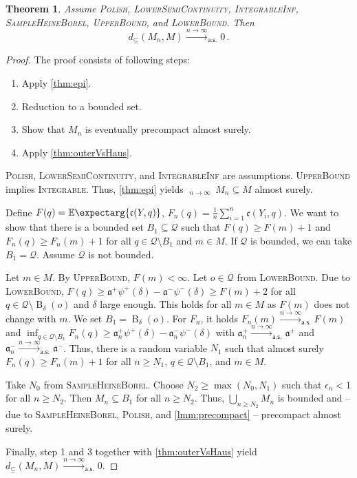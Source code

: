\documentclass{scrartcl}
\renewcommand{\subset}{\subseteq}
\DeclareMathOperator{\ball}{\mathrm{B}}
\newcommand{\Ex}{\E\expectarg}
\newcommand*{\mc}[1]{\mathcal{#1}}
\newcommand*{\ms}[1]{\mathsf{#1}}
\newcommand*{\mf}[1]{\mathfrak{#1}}
\newcommand{\equationFullstop}{\, .}
\newcommand{\eqfs}{\equationFullstop}
\DeclareMathOperator*{\outerlim}{lim\, \overline{sup}}
\theoremstyle{plain}\newtheorem{theorem}{Theorem}[section]
\theoremstyle{definition}
\theoremstyle{remark}
\begin{document}
\begin{theorem}\label{thm:consistency}
	Assume \textsc{Polish}, \textsc{LowerSemiContinuity}, \textsc{IntegrableInf},  \textsc{SampleHeineBorel}, \textsc{UpperBound}, and \textsc{LowerBound}. Then
	\begin{equation*}
		d_\subset(M_n, M) \xrightarrow{n\to\infty}_{\ms{a.s.}} 0
		\eqfs
	\end{equation*}
\end{theorem}
\begin{proof}
The proof consists of following steps:
\begin{enumerate}
\item Apply \autoref{thm:epi}.
\item Reduction to a bounded set.
\item Show that $M_n$ is eventually precompact almost surely.
\item Apply \autoref{thm:outerVsHaus}.
\end{enumerate}
\noindent
\underline{}
\textsc{Polish}, \textsc{LowerSemiContinuity}, and \textsc{IntegrableInf} are assumptions. \textsc{UpperBound} implies \textsc{Integrable}. Thus, \autoref{thm:epi} yields $\outerlim_{n\to\infty}\, M_n \subset M$ almost surely.

\noindent
\underline{}
Define $F(q) = \Ex{\mf c(Y, q)}$, $F_n(q) = \frac1n\sum_{i=1}^n \mf c(Y_i, q)$. 
We want to show that there is a bounded set $B_1 \subset \mc Q$ such that $F(q) \geq F(m) + 1$ and $F_n(q) \geq F_n(m) + 1$ for all $q\in \mc Q \setminus B_1$ and $m \in M$. If $\mc Q$ is bounded, we can take $B_1 = \mc Q$. Assume $\mc Q$ is not bounded. 

Let $m \in M$. By \textsc{UpperBound}, $F(m) < \infty$. Let $o\in\mc Q$ from \textsc{LowerBound}.
Due to \textsc{LowerBound}, $F(q) \geq \mf a^+ \psi^+(\delta) - \mf a^- \psi^-(\delta) \geq  F(m) + 2$ for all $q\in\mc Q\setminus \ball_\delta(o)$ and $\delta$ large enough. This holds for all $m\in M$ as $F(m)$ does not change with $m$. We set $B_1 = \ball_\delta(o)$. For $F_n$, it holds $F_n(m) \xrightarrow{n\to\infty}_{\ms{a.s.}} F(m)$ and $\inf_{q\in\mc Q \setminus B_1} F_n(q) \geq \mf a^+_n \psi^+(\delta) - \mf a^-_n \psi^-(\delta)$ with $\mf a^+_n \xrightarrow{n\to\infty}_{\ms{a.s.}} \mf a^+$ and $\mf a^-_n \xrightarrow{n\to\infty}_{\ms{a.s.}} \mf a^-$.
Thus, there is a random variable $N_1$ such that almost surely $F_n(q) \geq F_n(m) + 1$ for all $n \geq N_1$, $q\in \mc Q \setminus B_1$, and $m\in M$.

\noindent
\underline{}
Take $N_0$ from \textsc{SampleHeineBorel}. Choose $N_2\geq \max(N_0, N_1)$ such that $\epsilon_n < 1$ for all $n \geq N_2$. Then $M_n \subset B_1$ for all $n\geq N_2$. Thus, $\bigcup_{n\geq N_2}M_n$ is bounded and -- due to \textsc{SampleHeineBorel}, \textsc{Polish}, and \autoref{lmm:precompact} -- precompact almost surely. 

\noindent
\underline{}
Finally, step 1 and 3 together with \autoref{thm:outerVsHaus} yield $d_\subset(M_n, M) \xrightarrow{n\to\infty}_{\ms{a.s.}} 0$.
\end{proof}
\end{document}
